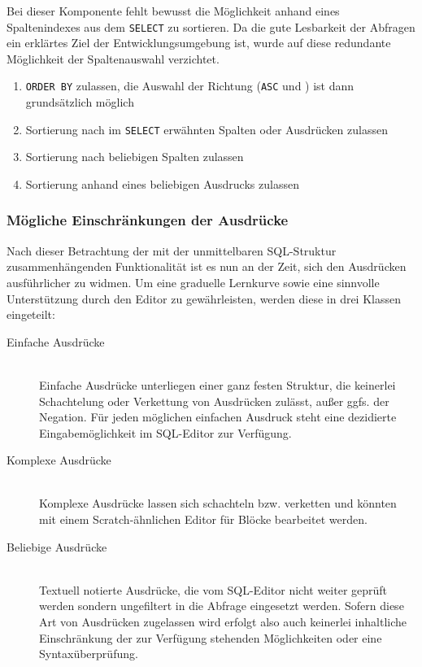 \begin{enumerate}
  Bei dieser Komponente fehlt bewusst die Möglichkeit anhand eines Spaltenindexes aus dem \texttt{SELECT} zu sortieren. Da die gute Lesbarkeit der Abfragen ein erklärtes Ziel der Entwicklungsumgebung ist, wurde auf diese redundante Möglichkeit der Spaltenauswahl verzichtet.
  \begin{enumerate}
  \item \label{feat:order-allow} \texttt{ORDER BY} zulassen, die Auswahl der Richtung (\texttt{ASC} und ) ist dann grundsätzlich möglich
  \item \label{feat:order-select} Sortierung nach im \texttt{SELECT} erwähnten Spalten oder Ausdrücken zulassen
  \item \label{feat:order-any-column} Sortierung nach beliebigen Spalten zulassen
  \item \label{feat:order-expression} Sortierung anhand eines beliebigen Ausdrucks zulassen
  \end{enumerate}
\end{enumerate}

\subsubsection{Mögliche Einschränkungen der Ausdrücke}
\label{sec:sql-subset-expression}

Nach dieser Betrachtung der mit der unmittelbaren SQL-Struktur zusammenhängenden Funktionalität ist es nun an der Zeit, sich den Ausdrücken ausführlicher zu widmen. Um eine graduelle Lernkurve sowie eine sinnvolle Unterstützung durch den Editor zu gewährleisten, werden diese in drei Klassen eingeteilt:

\begin{description}
\item[Einfache Ausdrücke] \hfill\\
  Einfache Ausdrücke unterliegen einer ganz festen Struktur, die keinerlei Schachtelung oder Verkettung von Ausdrücken zulässt, außer ggfs. der Negation. Für jeden möglichen einfachen Ausdruck steht eine dezidierte Eingabemöglichkeit im SQL-Editor zur Verfügung.
\item[Komplexe Ausdrücke] \hfill\\
  Komplexe Ausdrücke lassen sich schachteln bzw. verketten und könnten mit einem Scratch-ähnlichen Editor für Blöcke bearbeitet werden.
\item[Beliebige Ausdrücke] \hfill\\
  Textuell notierte Ausdrücke, die vom SQL-Editor nicht weiter geprüft werden sondern ungefiltert in die Abfrage eingesetzt werden. Sofern diese Art von Ausdrücken zugelassen wird erfolgt also auch keinerlei inhaltliche Einschränkung der zur Verfügung stehenden Möglichkeiten oder eine Syntaxüberprüfung.
\end{description}

